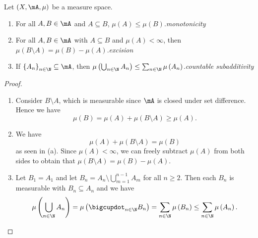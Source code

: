 \documentclass[pmath451]{subfiles}
\begin{document}
    \rruleline
    
    \begin{prop}{}
        Let $\left( X,\mA,\mu \right)$ be a measure space.
        \begin{enumerate}
            \item For all $A,B\in\mA$ and $A\subseteq B$, $\mu\left( A \right)\leq\mu\left( B \right)$.\hfill\textit{monotonicity}
            \item For all $A,B\in\mA$ with $A\subseteq B$ and $\mu\left( A \right)<\infty$, then $\mu\left( B\setminus A \right) = \mu\left( B \right)-\mu\left( A \right)$.\hfill\textit{excision}
            \item If $\left\lbrace A_n \right\rbrace^{}_{n\in\N}\subseteq\mA$, then $\mu\left( \bigcup^{}_{n\in\N}A_n \right) \leq \sum^{}_{n\in\N}\mu\left( A_n \right)$.\hfill\textit{countable subadditivity}
        \end{enumerate}
    \end{prop}
    
    \begin{proof}
        \begin{enumerate}
            \item Consider $B\setminus A$, which is measurable since $\mA$ is closed under set difference. Hence we have
                \begin{equation*}
                    \mu\left( B \right) = \mu\left( A \right) + \mu\left( B\setminus A \right) \geq \mu\left( A \right).
                \end{equation*}
            \item We have
                \begin{equation*}
                    \mu\left( A \right) + \mu\left( B\setminus A \right) = \mu\left( B \right)
                \end{equation*}
                as seen in (a). Since $\mu\left( A \right)<\infty$, we can freely subtract $\mu\left( A \right)$ from both sides to obtain that $\mu\left( B\setminus A \right) = \mu\left( B \right)-\mu\left( A \right)$.
            \item Let $B_1 = A_1$ and let $B_n = A_n\setminus \bigcup^{n-1}_{m=1}A_m$ for all $n\geq 2$. Then each $B_n$ is measurable with $B_n\subseteq A_n$ and we have
                \begin{equation*}
                    \mu\left( \bigcup^{}_{n\in\N}A_n \right) = \mu\left( \bigcupdot^{}_{n\in\N}B_n \right) = \sum^{}_{n\in\N} \mu\left( B_n \right) \leq \sum^{}_{n\in\N} \mu\left( A_n \right).
                \end{equation*}
        \end{enumerate}
    \end{proof}
\end{document}

